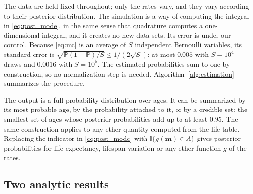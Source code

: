 \documentclass[12pt, letterpaper]{article}
\begin{document}
The data are held fixed throughout; only the rates vary, and they vary according to their posterior distribution. The simulation is a way of computing the integral in \eqref{eq:post_mode}, in the same sense that quadrature computes a one-dimensional integral, and it creates no new data sets. Its error is under our control. Because \eqref{eq:mc} is an average of $S$ independent Bernoulli variables, its standard error is $\sqrt{\mathbb{P}(1-\mathbb{P})/S} \le 1/(2\sqrt{S})$: at most $0.005$ with $S = 10^4$ draws and $0.0016$ with $S = 10^5$. The estimated probabilities sum to one by construction, so no normalization step is needed. Algorithm~\ref{alg:estimation} summarizes the procedure.

\begin{algorithm}[htb!]
\caption{Posterior distribution of the modal age at death}
\label{alg:estimation}
\small{
  \SetAlgoLined
}
\end{algorithm}

The output is a full probability distribution over ages. It can be summarized by its most probable age, by the probability attached to it, or by a credible set: the smallest set of ages whose posterior probabilities add up to at least $0.95$. The same construction applies to any other quantity computed from the life table. Replacing the indicator in \eqref{eq:post_mode} with $\mathbb{I}\{g(\bm{m}) \in A\}$ gives posterior probabilities for life expectancy, lifespan variation or any other function $g$ of the rates.

\subsection{Two analytic results}
\label{sec:analytic}
\end{document}
